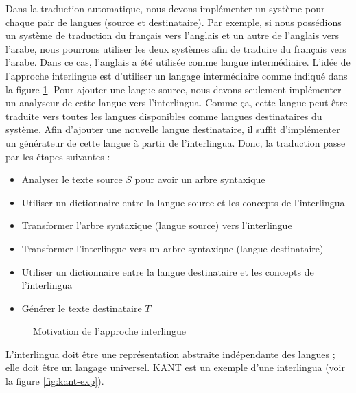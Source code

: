 \documentclass{KodeBook}
\begin{document}
Dans la traduction automatique, nous devons implémenter un système pour chaque pair de langues (source et destinataire). 
Par exemple, si nous possédions un système de traduction du français vers l'anglais et un autre de l'anglais vers l'arabe, nous pourrons utiliser les deux systèmes afin de traduire du français vers l'arabe. 
Dans ce cas, l'anglais a été utilisée comme langue intermédiaire. 
L'idée de l'approche interlingue est d'utiliser un langage intermédiaire comme indiqué dans la figure \ref{fig:mt-interlangue}.
Pour ajouter une langue source, nous devons seulement implémenter un analyseur de cette langue vers l'interlingua. 
Comme ça, cette langue peut être traduite vers toutes les langues disponibles comme langues destinataires du système. 
Afin d'ajouter une nouvelle langue destinataire, il suffit d'implémenter un générateur de cette langue à partir de l'interlingua. 
Donc, la traduction passe par les étapes suivantes :
\begin{itemize}
	\item Analyser le texte source $S$ pour avoir un arbre syntaxique
	\item Utiliser un dictionnaire entre la langue source et les concepts de l'interlingua 
	\item Transformer l'arbre syntaxique (langue source) vers l'interlingue
	\item Transformer l'interlingue vers un arbre syntaxique (langue destinataire)
	\item Utiliser un dictionnaire entre la langue destinataire et les concepts de l'interlingua 
	\item Générer le texte destinataire $T$
\end{itemize}

\begin{figure}[!ht]
	\centering
	\caption{Motivation de l'approche interlingue}
	\label{fig:mt-interlangue}
\end{figure}

L'interlingua doit être une représentation abstraite indépendante des langues ; elle doit être un langage universel.
KANT \cite{98-czuba-al} est un exemple d'une interlingua (voir la figure \ref{fig:kant-exp}).
\end{document}
